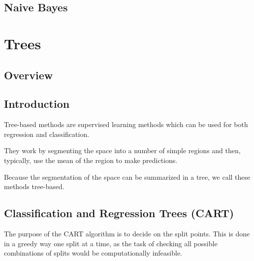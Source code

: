 \documentclass[aspectratio=169,10pt]{beamer}
\begin{document}
\subsection{Naive Bayes}
\begin{frame}{\secname}{\subsecname}

\end{frame}

\section{Trees}

\subsection{Overview}
\begin{frame}{\secname}{\subsecname}

\end{frame}

\subsection{Introduction}
\begin{frame}{\secname}{\subsecname}
  Tree-based methods are supervised learning methods which can be used for both regression and classification.
  
  They work by segmenting the space into a number of simple regions and then, typically, use the mean of the region to make predictions.
  
  Because the segmentation of the space can be summarized in a tree, we call these methods tree-based.
\end{frame}

\subsection{Classification and Regression Trees (CART)}
\begin{frame}{\secname}{\subsecname}
  The purpose of the CART algorithm is to decide on the split points. This is done in a greedy way one split at a time, as the task of checking all possible combinations of splits would be computationally infeasible.
\end{frame}
\end{document}
